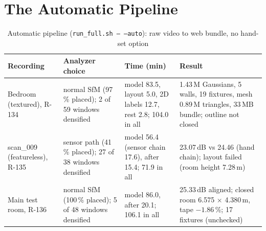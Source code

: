 \section{The Automatic Pipeline}
\begin{table}[htbp]
\centering\small
\caption{Automatic pipeline (\texttt{run\_full.sh -- --auto}): raw video to web bundle, no hand-set option}
\label{tab:eval-auto}
\begin{tabular}{p{2.6cm}p{3.2cm}p{3.6cm}p{4.2cm}}
\toprule
\textbf{Recording} & \textbf{Analyzer choice} & \textbf{Time (min)} & \textbf{Result} \\
\midrule
Bedroom (textured), R-134 & normal SfM (97\,\% placed); 2 of 59 windows densified & model 83.5, layout 5.0, 2D labels 12.7, rest 2.8; 104.0 in all & 1.43\,M Gaussians, 5 walls, 19 fixtures, mesh 0.89\,M triangles, 33\,MB bundle; outline not closed \\
scan\_009 (featureless), R-135 & sensor path (41\,\% placed); 27 of 38 windows densified & model 56.4 (sensor chain 17.6), after 15.4; 71.9 in all & 23.07\,dB vs 24.46 (hand chain); layout failed (room height 7.28\,m) \\
Main test room, R-136 & normal SfM (100\,\% placed); 5 of 48 windows densified & model 86.0, after 20.1; 106.1 in all & 25.33\,dB aligned; closed room 6.575 $\times$ 4.380\,m, tape $-1.86$\,\%; 17 fixtures (unchecked) \\
\bottomrule
\end{tabular}
\end{table}

